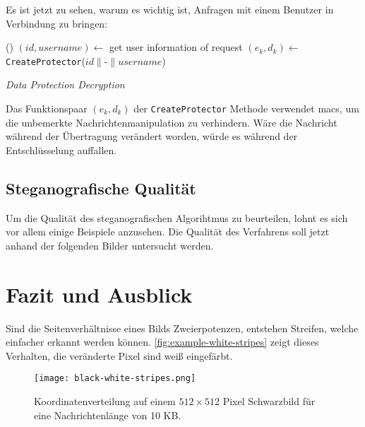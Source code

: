 \noindent
Es ist jetzt zu sehen, warum es wichtig ist, Anfragen mit einem Benutzer in Verbindung zu bringen:

\begin{algorithm}[h]
  \DontPrintSemicolon
  \Begin(){
    $(id, username) \leftarrow$ get user information of request\;
    $(e_k, d_k) \leftarrow$ \texttt{CreateProtector}($id \parallel \text{-} \parallel username$)\;
  }
  \caption{\textit{Data Protection Decryption}}
  \label{alg:data-unprotect}
\end{algorithm}

\noindent
Das Funktionspaar $(e_k, d_k)$ der \texttt{CreateProtector} Methode verwendet \acp{mac},
um die unbemerkte Nachrichtenmanipulation zu verhindern. Wäre die Nachricht während der Übertragung
verändert worden, würde es während der Entschlüsselung auffallen.

\subsection{Steganografische Qualität}
Um die Qualität des steganografischen Algorihtmus zu beurteilen,
lohnt es sich vor allem einige
Beispiele anzusehen. Die Qualität des Verfahrens soll jetzt
anhand der folgenden Bilder untersucht werden.

\newpage



\newpage



\newpage



\newpage





\section{Fazit und Ausblick}
Sind die Seitenverhältnisse eines Bilds Zweierpotenzen, entstehen Streifen,
welche einfacher erkannt werden können. \autoref{fig:example-white-stripes} zeigt dieses
Verhalten, die veränderte Pixel sind weiß eingefärbt.
\vspace{2cm}
\begin{figure}[h!]
  \centering
  \texttt{[image: black-white-stripes.png]}
  \caption{Koordinatenverteilung auf einem $512 \times 512$ Pixel Schwarzbild
    für eine Nachrichtenlänge von 10 KB.}
  \label{fig:example-white-stripes}
\end{figure}